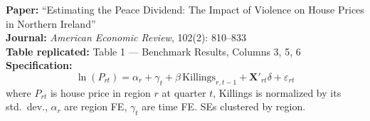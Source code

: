 \documentclass[11pt,a4paper]{article}
\begin{document}
\textbf{Paper:} ``Estimating the Peace Dividend: The Impact of Violence on House Prices in Northern Ireland''\\
\textbf{Journal:} \textit{American Economic Review}, 102(2): 810--833\\
\textbf{Table replicated:} Table 1 --- Benchmark Results, Columns 3, 5, 6\\
\textbf{Specification:}
\[
\ln(P_{rt}) = \alpha_r + \gamma_t + \beta\, \text{Killings}_{r,t-1} + \mathbf{X}'_{rt}\delta + \varepsilon_{rt}
\]
where $P_{rt}$ is house price in region $r$ at quarter $t$, Killings is normalized by its std.\ dev., $\alpha_r$ are region FE, $\gamma_t$ are time FE. SEs clustered by region.

\vspace{0.3cm}
\noindent{}
\end{document}
